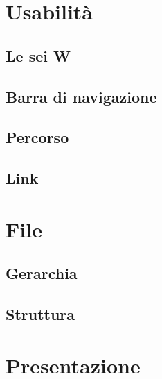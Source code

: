 \documentclass{article}
\begin{document}

\section{Usabilità}

\subsection{Le sei W}
\subsection{Barra di navigazione}
\subsection{Percorso}
\subsection{Link}


\section{File}
\subsection{Gerarchia}
\subsection{Struttura}


\section{Presentazione}

\end{document}
